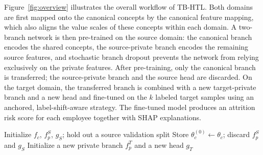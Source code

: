 \documentclass[runningheads]{llncs}
\begin{document}
Figure~\ref{fig:overview} illustrates the overall workflow of TB-HTL. Both domains are first mapped onto the canonical concepts by the canonical feature mapping, which also aligns the value scales of these concepts within each domain. A two-branch network is then pre-trained on the source domain: the canonical branch encodes the shared concepts, the source-private branch encodes the remaining source features, and stochastic branch dropout prevents the network from relying exclusively on the private features. After pre-training, only the canonical branch is transferred; the source-private branch and the source head are discarded. On the target domain, the transferred branch is combined with a new target-private branch and a new head and fine-tuned on the $k$ labeled target samples using an anchored, label-shift-aware strategy. The fine-tuned model produces an attrition risk score for each employee together with SHAP explanations.

\begin{algorithm}[t]
\caption{TB-HTL}\label{alg:tbhtl}
\small
{}
Initialize $f_c$, $f_p^S$, $g_S$; hold out a source validation split\;
Store $\theta_c^{(0)}\leftarrow\theta_c$; discard $f_p^S$ and $g_S$\;
Initialize a new private branch $f_p^T$ and a new head $g_T$\;
\;
\end{algorithm}
\end{document}
